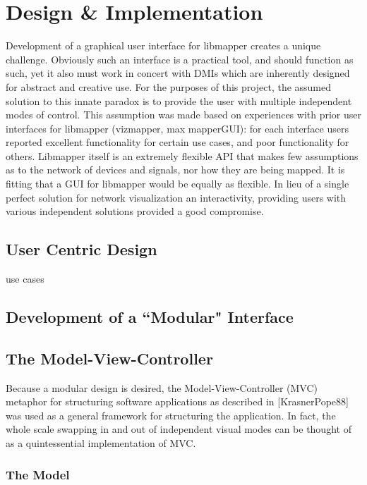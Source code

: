 \chapter{Design \& Implementation}

	Development of a graphical user interface for libmapper creates a unique challenge. Obviously such an interface is a practical tool, and should function as such, yet it also must work in concert with DMIs which are inherently designed for abstract and creative use. For the purposes of this project, the assumed solution to this innate paradox is to provide the user with multiple independent modes of control.  This assumption was made based on experiences with prior user interfaces for libmapper (vizmapper, max mapperGUI): for each interface users reported excellent functionality for certain use cases, and poor functionality for others. Libmapper itself is an extremely flexible API that makes few assumptions as to the network of devices and signals, nor how they are being mapped. It is fitting that a GUI for libmapper would be equally as flexible. In lieu of a single perfect solution for network visualization an interactivity, providing users with various independent solutions provided a good compromise.
	
\section{User Centric Design}
	use cases

\section{Development of a ``Modular" Interface}

\section{The Model-View-Controller}

	Because a modular design is desired, the Model-View-Controller (MVC) metaphor for structuring software applications as described in [KrasnerPope88] was used as a general framework for structuring the application. In fact, the whole scale swapping in and out of independent visual modes can be thought of as a quintessential implementation of MVC. 
	
\subsection{The Model}

